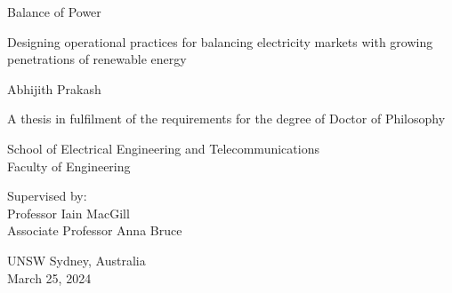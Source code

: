 \documentclass[12pt,a4paper,]{report}
\begin{document}
\begin{titlepage}
    \begin{center}


        \vspace*{2.5cm}

        \huge
        Balance of Power

                \vspace{.5cm}

        \Large
        Designing operational practices for balancing electricity
        markets with growing penetrations of renewable energy
        

        \vspace{1.5cm}

        \Large
        Abhijith Prakash

        \vspace{1.5cm}

        \normalsize
        A thesis in fulfilment of the requirements for the degree of Doctor
of Philosophy

        \vfill

        \normalsize
        School of Electrical Engineering and Telecommunications\\
        Faculty of Engineering\\

        \vfill

        \normalsize
        Supervised by:\\
        Professor Iain MacGill \\ Associate Professor Anna Bruce

        \vspace{0.8cm}


        \normalsize
        UNSW Sydney, Australia\\
        March 25, 2024


    \end{center}
\end{titlepage}
\end{document}
